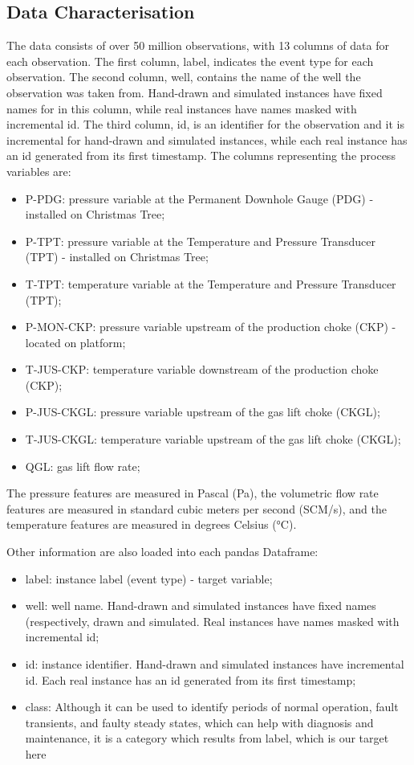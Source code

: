 \documentclass{article}
\begin{document}
\subsection{Data Characterisation}

The data consists of over 50 million observations, with 13 columns of data for each observation. The first column, label, indicates the event type for each observation. The second column, well, contains the name of the well the observation was taken from. Hand-drawn and simulated instances have fixed names for in this column, while real instances have names masked with incremental id. The third column, id, is an identifier for the observation and it is incremental for hand-drawn and simulated instances, while each real instance has an id generated from its first timestamp. The columns representing the process variables are:

\begin{itemize}
\item P-PDG: pressure variable at the Permanent Downhole Gauge (PDG) - installed on Christmas Tree;
\item P-TPT: pressure variable at the Temperature and Pressure Transducer (TPT) - installed on Christmas Tree;
\item T-TPT: temperature variable at the Temperature and Pressure Transducer (TPT);
\item P-MON-CKP: pressure variable upstream of the production choke (CKP) - located on platform;
\item T-JUS-CKP: temperature variable downstream of the production choke (CKP);
\item P-JUS-CKGL: pressure variable upstream of the gas lift choke (CKGL);
\item T-JUS-CKGL: temperature variable upstream of the gas lift choke (CKGL);
\item QGL: gas lift flow rate;
\end{itemize}

The pressure features are measured in Pascal (Pa), the volumetric flow rate features are measured in standard cubic meters per second (SCM/s), and the temperature features are measured in degrees Celsius (°C).

Other information are also loaded into each pandas Dataframe:

\begin{itemize}
\item label: instance label (event type) - target variable;
\item well: well name. Hand-drawn and simulated instances have fixed names (respectively, drawn and simulated. Real instances have names masked with incremental id;
\item id: instance identifier. Hand-drawn and simulated instances have incremental id. Each real instance has an id generated from its first timestamp;
\item class: Although it can be used to identify periods of normal operation, fault transients, and faulty steady states, which can help with diagnosis and maintenance, it is a category which results from label, which is our target here
\end{itemize}
\end{document}
